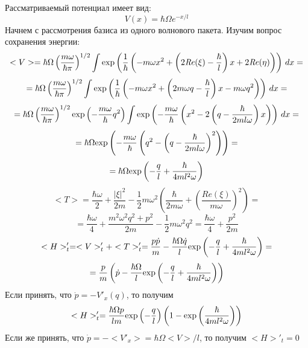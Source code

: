 Рассматриваемый потенциал имеет вид:
$$V(x) = \hbar\Omega e^{-x/l}$$
Начнем с рассмотрения базиса из одного волнового пакета.
Изучим вопрос сохранения энергии:
$$<V> = \hbar\Omega%
	\left(\frac{m\omega}{\hbar\pi}\right)^{1/2}%
	\int \myexp{\frac{1}{\hbar}\left(-m\omega x^2 + %
					 \left(2\mathit{Re}(\xi)-%
					 \frac{\hbar}{l}\right)x + %
					 2\mathit{Re}(\eta)\right)}\,dx=$$
$$=\hbar\Omega%
   \left(\frac{m\omega}{\hbar\pi}\right)^{1/2}%
   \int \myexp{\frac{1}{\hbar}\left(-m\omega x^2 + %
					 \left(2m\omega q-%
					 \frac{\hbar}{l}\right)x - %
					 m\omega q^2\right)}\,dx=$$
$$=\hbar\Omega%
   \left(\frac{m\omega}{\hbar\pi}\right)^{1/2}%
   \myexp{-\frac{m\omega}{\hbar} q^2}\int\myexp{-\frac{m\omega}{\hbar}%
						\left( x^2 - 2\left(q - %
						    \frac{\hbar}{2ml\omega}%
						\right)x
						\right)}\,dx=$$
$$=\hbar\Omega%
   \myexp{-\frac{m\omega}{\hbar}\left(q^2-%
				     \left(q-%
				     \frac{\hbar}{2ml\omega}%
				     \right)^2\right)}=$$
$$=\hbar\Omega\text{exp}\left( -\frac{q}{l}+\frac{\hbar}{4ml^2\omega} \right)$$
$$<T> = \frac{\hbar\omega}{2}+%
	\frac{|\xi|^2}{2m}-%
	\frac{1}{2}m\omega^2%
	\left(\frac{\hbar}{2m\omega}+%
	\left(\frac{\mathit{Re}(\xi)}{m\omega}%
	\right)^2\right)=$$
$$=\frac{\hbar\omega}{4}+%
   \frac{m^2\omega^2q^2+p^2}{2m}-%
   \frac{1}{2}m\omega^2q^2 = \frac{\hbar\omega}{4}+\frac{p^2}{2m}$$
$$<H>'_t=<V>'_t+<T>'_t=\frac{p\dot{p}}{m}-%
		       \frac{\hbar\Omega\dot{q}}{l}\myexp{-\frac{q}{l}+%
					       \frac{\hbar}{4ml^2\omega}}=$$
$$=\frac{p}{m}\left(\dot{p}-\frac{\hbar\Omega}{l}\myexp{-\frac{q}{l}+%
					      \frac{\hbar}{4ml^2\omega}}%
	      \right)$$
Если принять, что $\dot{p} = -V'_x(q)$, то получим
$$<H>'_t=\frac{\hbar\Omega p}{lm}\myexp{-\frac{q}{l}}%
	 \left(1-\myexp{\frac{\hbar}{4ml^2\omega}}\right)$$
Если же принять, что $\dot{p}=-<V'_x>=\hbar\Omega<V>/l$, то получим $<H>'_t=0$


